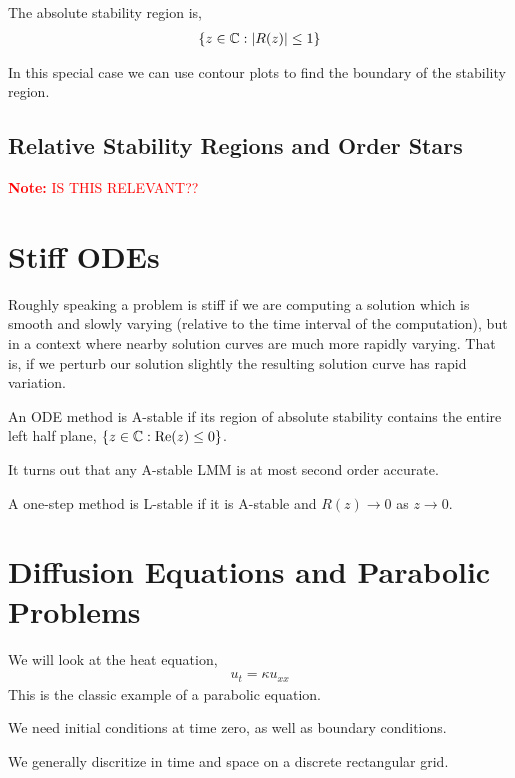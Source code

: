 \documentclass[12pt]{article}
\newcommand{\note}[1]{\textcolor{red}{\textbf{Note:} #1}}
\begin{document}
The absolute stability region is,
\begin{align*}
    \{z \in \mathbb{C} : |R(z)| \leq 1 \}
\end{align*}

In this special case we can use contour plots to find the boundary of the stability region.

\subsection{Relative Stability Regions and Order Stars}

\note{IS THIS RELEVANT??}

\section{Stiff ODEs}

Roughly speaking a problem is stiff if we are computing a solution which is smooth and slowly varying (relative to the time interval of the computation), but in a context where nearby solution curves are much more rapidly varying. That is, if we perturb our solution slightly the resulting solution curve has rapid variation.

\begin{definition}[A-stability]
    An ODE method is A-stable if its region of absolute stability contains the entire left half plane, \( \{z\in\mathbb{C} : \operatorname{Re}(z) \leq 0 \} \).
\end{definition}

It turns out that any A-stable LMM is at most second order accurate.

\begin{definition}[L-stablity]
    A one-step method is L-stable if it is A-stable and \( R(z) \to 0 \) as \( z\to 0 \).
\end{definition}

\section{Diffusion Equations and Parabolic Problems}

We will look at the heat equation,
\begin{align*}
    u_t = \kappa u_{xx}
\end{align*}
This is the classic example of a parabolic equation.

We need initial conditions at time zero, as well as boundary conditions.

We generally discritize in time and space on a discrete rectangular grid.
\end{document}
